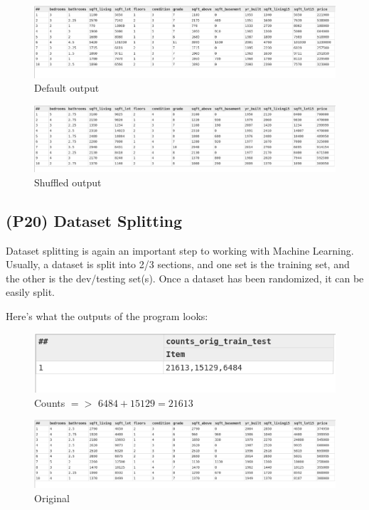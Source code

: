 \documentclass[a4paper,oneside,12pt]{book}
\begin{document}
\begin{figure}[h]
    \centering
    \includegraphics[width=\linewidth]{../output/54/default}
    \caption{Default output}
\end{figure}
\begin{figure}[h]
    \centering
    \includegraphics[width=\linewidth]{../output/54/shuffled}
    \caption{Shuffled output}
\end{figure}


\subsection{(P20) Dataset Splitting}

Dataset splitting is again an important step to working with Machine Learning. Usually, a dataset is split into 2/3 sections, and one set is the training set, and the other is the dev/testing set(s). Once a dataset has been randomized, it can be easily split.



Here's what the outputs of the program looks:

\begin{figure}[h]
    \centering
    \includegraphics[width=.7\linewidth]{../output/55/counts}
    \caption{Counts $=>$ $6484+15129=21613$}
\end{figure}

\begin{figure}[h]
    \centering
    \includegraphics[width=\linewidth]{../output/55/original}
    \caption{Original}
\end{figure}
\end{document}
